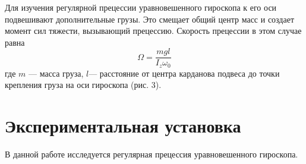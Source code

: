 \documentclass[a4paper,12pt]{article} %
\begin{document}
Для изучения регулярной прецессии уравновешенного гироскопа к его оси подвешивают дополнительные грузы. Это смещает общий центр масс и создает момент сил тяжести, вызывающий прецессию. Скорость прецессии в этом случае равна
\begin{equation}
\Omega = \frac{mgl}{I_z\omega_0}
\end{equation}
где $m$ — масса груза, $l$— расстояние от центра карданова подвеса до точки крепления груза на оси гироскопа (рис. 3).

\section{Экспериментальная установка}

В данной работе исследуется регулярная прецессия уравновешенного гироскопа.
\end{document}
